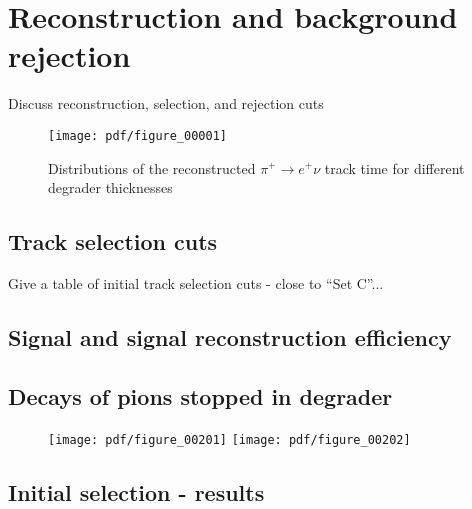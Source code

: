 \section {Reconstruction and background rejection}

Discuss reconstruction, selection, and rejection cuts

\begin{figure}
  \centering
  \texttt{[image: pdf/figure\_00001]}
  \caption{
    \label{fig:pions_timing}
    Distributions of the reconstructed $\pi^+ \to e^+ \nu$ track time for different degrader thicknesses
  }
\end{figure}



\subsection{Track selection cuts}

Give a table of initial track selection cuts - close to ``Set C''...


\subsection{Signal and signal reconstruction efficiency}

\subsection{Decays of pions stopped in degrader}

\begin{figure}[H]
  \texttt{[image: pdf/figure\_00201]}
  \texttt{[image: pdf/figure\_00202]}
  \caption{
  }
\end{figure}



\subsection{Initial selection - results}




